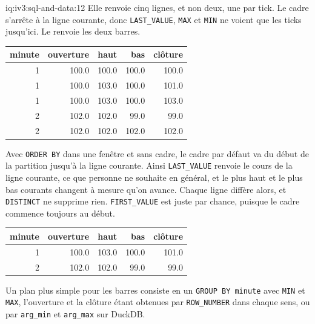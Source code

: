 \begin{solution}{iq:iv3:sql-and-data:12}
Elle renvoie cinq lignes, et non deux, une par tick. Le cadre s'arrête à la ligne courante, donc \texttt{LAST\_VALUE}, \texttt{MAX} et \texttt{MIN} ne voient que les ticks jusqu'ici. Le  renvoie les deux barres.
\begin{center}\small
\begin{tabular}{rrrrr}
minute & ouverture & haut & bas & clôture\\\hline
1 & 100.0 & 100.0 & 100.0 & 100.0\\
1 & 100.0 & 103.0 & 100.0 & 101.0\\
1 & 100.0 & 103.0 & 100.0 & 103.0\\
2 & 102.0 & 102.0 & 99.0 & 99.0\\
2 & 102.0 & 102.0 & 102.0 & 102.0
\end{tabular}
\end{center}
Avec \texttt{ORDER BY} dans une fenêtre et sans cadre, le cadre par défaut va du début de la partition jusqu'à la ligne courante. Ainsi \texttt{LAST\_VALUE} renvoie le cours de la ligne courante, ce que personne ne souhaite en général, et le plus haut et le plus bas courants changent à mesure qu'on avance. Chaque ligne diffère alors, et \texttt{DISTINCT} ne supprime rien. \texttt{FIRST\_VALUE} est juste par chance, puisque le cadre commence toujours au début.
\label{lst:iv3:sq:barsfixed}
\begin{center}\small
\begin{tabular}{rrrrr}
minute & ouverture & haut & bas & clôture\\\hline
1 & 100.0 & 103.0 & 100.0 & 101.0\\
2 & 102.0 & 102.0 & 99.0 & 99.0
\end{tabular}
\end{center}
Un plan plus simple pour les barres consiste en un \texttt{GROUP BY minute} avec \texttt{MIN} et \texttt{MAX}, l'ouverture et la clôture étant obtenues par \texttt{ROW\_NUMBER} dans chaque sens, ou par \texttt{arg\_min} et \texttt{arg\_max} sur DuckDB.

\end{solution}

